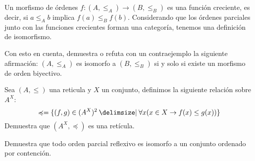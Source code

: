 \begin{exercise}[parzfc=2]
  Un morfismo de órdenes $f\colon (A,\leq_A)\to (B,\leq_B)$ es una función creciente, es decir, si $a\leq_A b$ implica $f(a)\leq_B f(b)$. Considerando que los órdenes parciales junto con las funciones crecientes forman una categoría, tenemos una definición de isomorfismo.

  Con esto en cuenta, demuestra o refuta con un contraejemplo la siguiente afirmación: $(A,\leq_A)$ es isomorfo a $(B,\leq_B)$ si y solo si existe un morfismo de orden biyectivo.
\end{exercise}

\begin{exercise}[parzfc=2]
  Sea $(A,\leq)$ una reticula y $X$ un conjunto, definimos la siguiente relación sobre $A^X$:
  \[\preccurlyeq =\set{(f,g)\in (A^X)^2 \st \forall x(x\in X \rightarrow f(x)\leq g(x))}\]
  Demuestra que $(A^X,\preccurlyeq)$ es una retícula.
\end{exercise}

\begin{exercise}[parzfc=2]
  Demuestra que todo orden parcial reflexivo es isomorfo a un conjunto ordenado por contención.
\end{exercise}

